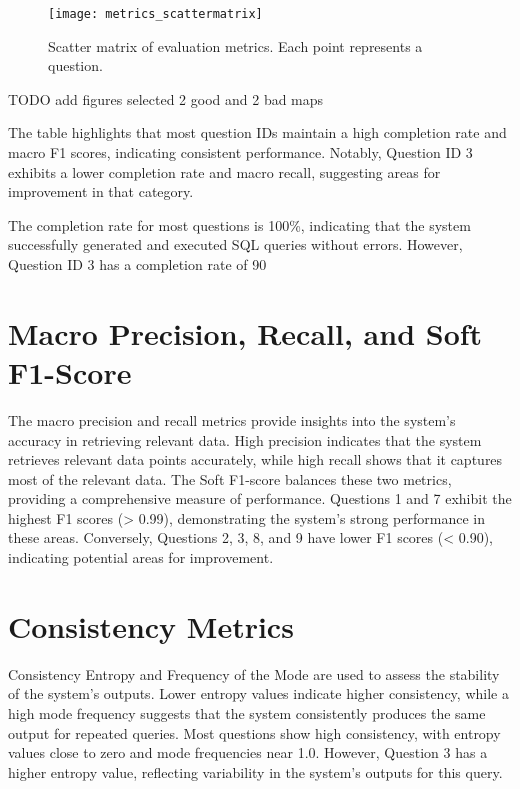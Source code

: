 \begin{figure}[htbp]
    \centering
    \texttt{[image: metrics\_scattermatrix]}
    \caption{Scatter matrix of evaluation metrics. Each point represents a question.}
    \label{fig:metrics_scattermatrix}
\end{figure}

TODO add figures selected 2 good and 2 bad maps


The table highlights that most question IDs maintain a high completion rate and macro F1 scores, indicating consistent performance. Notably, Question ID 3 exhibits a lower completion rate and macro recall, suggesting areas for improvement in that category. 

The completion rate for most questions is 100\%, indicating that the system successfully generated and executed SQL queries without errors. However, Question ID 3 has a completion rate of 90%

\section{Macro Precision, Recall, and Soft F1-Score}
The macro precision and recall metrics provide insights into the system's accuracy in retrieving relevant data. High precision indicates that the system retrieves relevant data points accurately, while high recall shows that it captures most of the relevant data. The Soft F1-score balances these two metrics, providing a comprehensive measure of performance. Questions 1 and 7 exhibit the highest F1 scores (> 0.99), demonstrating the system's strong performance in these areas. Conversely, Questions 2, 3, 8, and 9 have lower F1 scores (< 0.90), indicating potential areas for improvement.

\section{Consistency Metrics}
Consistency Entropy and Frequency of the Mode are used to assess the stability of the system's outputs. Lower entropy values indicate higher consistency, while a high mode frequency suggests that the system consistently produces the same output for repeated queries. Most questions show high consistency, with entropy values close to zero and mode frequencies near 1.0. However, Question 3 has a higher entropy value, reflecting variability in the system's outputs for this query.


